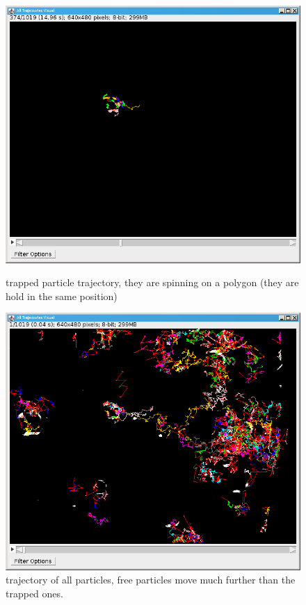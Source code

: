 \documentclass[a4paper,12pt,twoside]{article}	%
\begin{document}
\begin{figure}
\centering
\begin{minipage}{.5\textwidth}
	\centering
	\includegraphics[width=.95\linewidth]{./figures/trapped_traj}
	\caption{trapped particle trajectory, they are spinning on a polygon (they are hold in the same position)}
	\label{fig:test1}
\end{minipage}%
\begin{minipage}{.5\textwidth}
	\centering
	\includegraphics[width=.95\linewidth]{./figures/trapped_traj_2}
	\caption{trajectory of all particles, free particles move much further than the trapped ones.}
	\label{fig:test2}
\end{minipage}
\end{figure}
\end{document}
